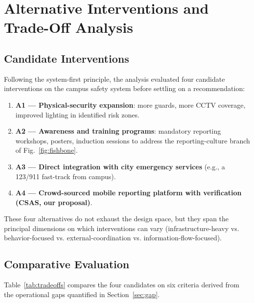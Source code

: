 \documentclass[conference]{IEEEtran}
\begin{document}
\section{Alternative Interventions and Trade-Off Analysis}
\label{sec:alternatives}

\subsection{Candidate Interventions}
Following the system-first principle, the analysis evaluated four
candidate interventions on the campus safety system before settling
on a recommendation:

\begin{enumerate}[leftmargin=*,itemsep=2pt]
\item \textbf{A1 --- Physical-security expansion}: more guards, more
      CCTV coverage, improved lighting in identified risk zones.
\item \textbf{A2 --- Awareness and training programs}: mandatory
      reporting workshops, posters, induction sessions to address
      the reporting-culture branch of Fig.~\ref{fig:fishbone}.
\item \textbf{A3 --- Direct integration with city emergency services}
      (e.g., a 123/911 fast-track from campus).
\item \textbf{A4 --- Crowd-sourced mobile reporting platform with
      verification (CSAS, our proposal)}.
\end{enumerate}

These four alternatives do not exhaust the design space, but they
span the principal dimensions on which interventions can vary
(infrastructure-heavy vs. behavior-focused vs. external-coordination
vs. information-flow-focused).

\subsection{Comparative Evaluation}
Table~\ref{tab:tradeoffs} compares the four candidates on six
criteria derived from the operational gaps quantified in
Section~\ref{sec:gap}.
\end{document}
